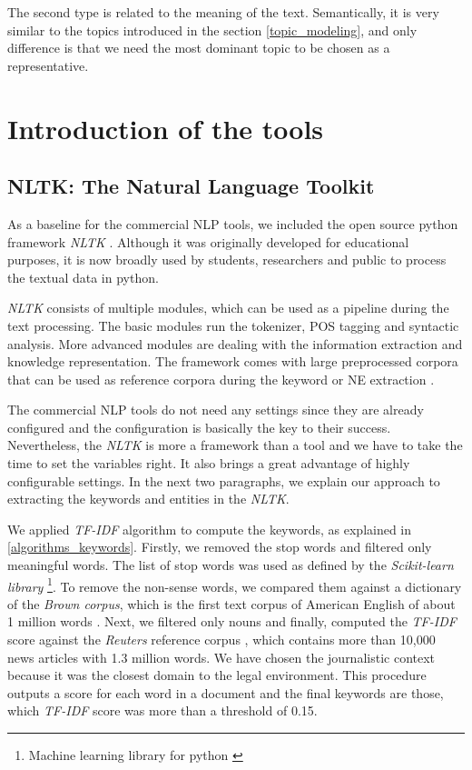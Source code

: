 \documentclass[
  digital, %
  table,   %
  lof,     %
  lot,     %
]{fithesis3}
\begin{document}
The second type is related to the meaning of the text.
Semantically, it is very similar to the topics introduced in the section \ref{topic_modeling}, and only difference is that we need the most dominant topic to be chosen as a representative.

\section{Introduction of the tools}

\subsection{NLTK: The Natural Language Toolkit}
As a baseline for the commercial NLP tools, we included the open source python framework \textit{NLTK} \cite{bird2004nltk}.
Although it was originally developed for educational purposes, it is now broadly used by students, researchers and public to process the textual data in python.

\textit{NLTK} consists of multiple modules, which can be used as a pipeline during the text processing. 
The basic modules run the tokenizer, POS tagging and syntactic analysis.
More advanced modules are dealing with the information extraction and knowledge representation.
The framework comes with large preprocessed corpora that can be used as reference corpora during the keyword or NE extraction \cite{bird2009natural}.

The commercial NLP tools do not need any settings since they are already configured and the configuration is basically the key to their success.
Nevertheless, the \textit{NLTK} is more a framework than a tool and we have to take the time to set the variables right.
It also brings a great advantage of highly configurable settings.
In the next two paragraphs, we explain our approach to extracting the keywords and entities in the \textit{NLTK}.

We applied \textit{TF-IDF} algorithm to compute the keywords, as explained in \ref{algorithms_keywords}.
Firstly, we removed the stop words and filtered only meaningful words.
The list of stop words was used as defined by the \textit{Scikit-learn library} \footnote{Machine learning library for python \cite{pedregosa2011scikit}}.
To remove the non-sense words, we compared them against a dictionary of the \textit{Brown corpus}, which is the first text corpus of American English of about 1 million words \cite{brownCorpus}.
Next, we filtered only nouns and finally, computed the \textit{TF-IDF} score against the \textit{Reuters} reference corpus \cite[sec. 2.1]{bird2009natural}, which contains more than 10,000 news articles with 1.3 million words.
We have chosen the journalistic context because it was the closest domain to the legal environment.
This procedure outputs a score for each word in a document and the final keywords are those, which \textit{TF-IDF} score was more than a threshold of 0.15.
\end{document}
